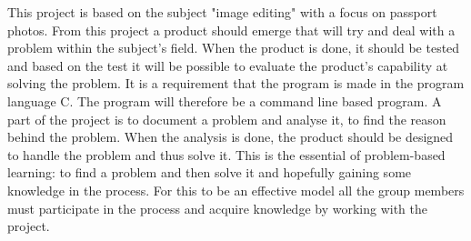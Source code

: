 This project is based on the subject "image editing" with a focus on passport photos. From this project a product should emerge that will try and deal with a problem within the subject's field. When the product is done, it should be tested and based on the test it will be possible to evaluate the product's capability at solving the problem.
\newline
It is a requirement that the program is made in the program language C. The program will therefore be a command line based program.\newline
A part of the project is to document a problem and analyse it, to find the reason behind the problem. When the analysis is done, the product should be designed to handle the problem and thus solve it.
\newline
This is the essential of problem-based learning: to find a problem and then solve it and hopefully gaining some knowledge in the process.
For this to be an effective model all the group members must participate in the process and acquire knowledge by working with the project.